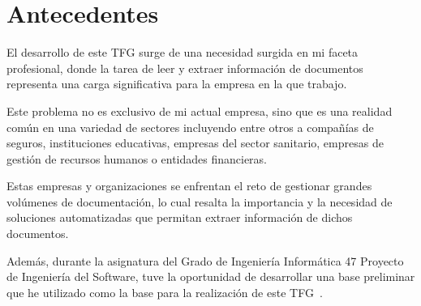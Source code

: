\section{Antecedentes}

El desarrollo de este TFG surge de una necesidad surgida en mi faceta profesional, donde la tarea de leer y extraer
información de documentos representa una carga significativa para la empresa en la que trabajo.

Este problema no es exclusivo de mi actual empresa, sino que es una realidad común en una variedad de sectores
incluyendo entre otros a compañías de seguros, instituciones educativas, empresas del sector sanitario, empresas de
gestión de recursos humanos o entidades financieras.

Estas empresas y organizaciones se enfrentan el reto de gestionar grandes volúmenes de documentación, lo cual resalta la
importancia y la necesidad de soluciones automatizadas que permitan extraer información de dichos documentos.

Además, durante la asignatura del Grado de Ingeniería Informática 47 Proyecto de Ingeniería del Software, tuve la
oportunidad de desarrollar una base preliminar que he utilizado como la base para la realización de este
TFG~\cite{url_viu_47_proyecto_ingenieria}.
